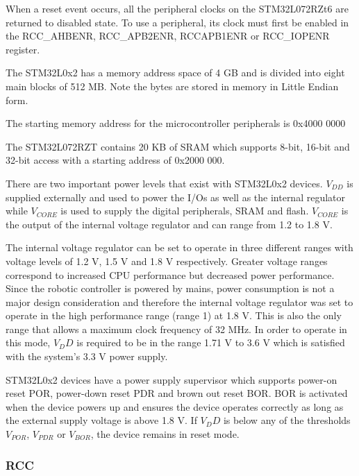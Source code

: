 \begin{compactitem}
	\item When a reset event occurs, all the peripheral clocks on the STM32L072RZt6 are returned to disabled state. To use a peripheral, its clock must first be enabled in the RCC\_AHBENR, RCC\_APB2ENR, RCCAPB1ENR or RCC\_IOPENR register.
	\item The STM32L0x2 has a memory address space of 4 GB and is divided into eight main blocks of 512 MB. Note the bytes are stored in memory in Little Endian form.
	\item The starting memory address for the microcontroller peripherals is 0x4000 0000
	\item The STM32L072RZT contains 20 KB of SRAM which supports 8-bit, 16-bit and 32-bit access with a starting address of 0x2000 000.
	\item There are two important power levels that exist with STM32L0x2 devices. $V_{DD}$ is supplied externally and used to power the I/Os as well as the internal regulator while $V_{CORE}$ is used to supply the digital peripherals, SRAM and flash. $V_{CORE}$ is the output of the internal voltage regulator and can range from 1.2 to 1.8 V.
	\item The internal voltage regulator can be set to operate in three different ranges with voltage levels of 1.2 V, 1.5 V and 1.8 V respectively. Greater voltage ranges correspond to increased CPU performance but decreased power performance. Since the robotic controller is powered by mains, power consumption is not a major design consideration and therefore the internal voltage regulator was set to operate in the high performance range (range 1) at 1.8 V. This is also the only range that allows a maximum clock frequency of 32 MHz. In order to operate in this mode, $V_DD$ is required to be in the range 1.71 V to 3.6 V which is satisfied with the system's 3.3 V power supply.
	\item STM32L0x2 devices have a power supply supervisor which supports power-on reset \ac{POR}, power-down reset \ac{PDR} and brown out reset \ac{BOR}. \ac{BOR} is activated when the device powers up and ensures the device operates correctly as long as the external supply voltage is above 1.8 V. If $V_DD$ is below any of the thresholds $V_{POR}$, $V_{PDR}$ or $V_{BOR}$, the device remains in reset mode.
\end{compactitem}

\subsubsection{\ac{RCC}}

